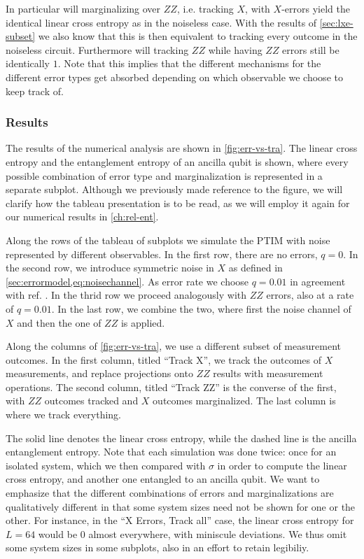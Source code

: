 In particular will marginalizing over $ZZ$, i.e. tracking $X$, with $X$-errors
yield the identical linear cross entropy as in the noiseless case. With the
results of \cref{sec:lxe-subset} we also know that this is then equivalent to
tracking every outcome in the noiseless circuit.
Furthermore will tracking
$ZZ$ while having $ZZ$ errors still be identically $1$. 
Note that this implies that the different mechanisms for the different error
types get absorbed depending on which observable we choose to keep track of. 

\subsubsection{Results}
The results of the numerical analysis are shown in \cref{fig:err-vs-tra}. The
linear cross entropy and the entanglement entropy of an ancilla qubit is shown,
where every possible combination of error type and marginalization is represented in
a separate subplot. Although we previously made reference to the figure, we
will clarify how the tableau presentation is to be read, as we will employ it
again for our numerical results in \cref{ch:rel-ent}.

Along the rows of the
tableau of subplots we simulate the PTIM with noise represented by different
observables. In the first row, there are no errors, $q=0$. In the second row,
we introduce symmetric noise in $X$ as defined in
\cref{sec:errormodel,eq:noisechannel}. As error rate we choose $q=0.01$ in
agreement with ref. \cite{tikhanovskayaUniversalityCrossEntropy2023}. In the
thrid row we proceed analogously with $ZZ$ errors, also at a rate of $q=0.01$.
In the last row, we combine the two, where first the noise channel of $X$ and
then the one of $ZZ$ is applied. 

Along the columns of \cref{fig:err-vs-tra}, we use a different subset of
measurement outcomes. In the first column, titled \enquote{Track X}, we track
the outcomes of $X$ measurements, and replace projections onto $ZZ$ results
with measurement operations. The second column, titled \enquote{Track ZZ} is
the converse of the first, with $ZZ$ outcomes tracked and $X$ outcomes
marginalized. The last column is where we track everything. 

The solid line denotes the linear cross entropy, while the dashed line is the
ancilla entanglement entropy. Note that each simulation was done twice: once
for an isolated system, which we then compared with $\sigma$ in order to
compute the linear cross entropy, and another one entangled to an ancilla
qubit.  We want to emphasize that the different combinations of errors and
marginalizations are qualitatively different in that some system sizes need not
be shown for one or the other. For instance, in the \enquote{X Errors, Track
all} case, the linear cross entropy for $L=64$ would be $0$ almost everywhere,
with miniscule deviations. We thus omit some system sizes in some subplots,
also in an effort to retain legibiliy.

